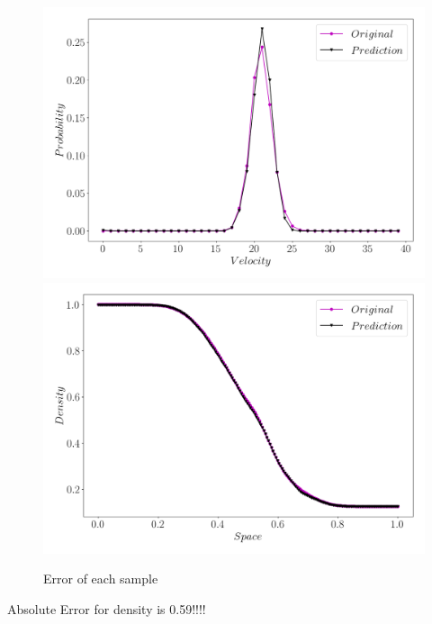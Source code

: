 \documentclass[12pt, a4paper]{article}
\begin{document}
\begin{figure}[htb!]
	\centering
	\includegraphics[width=.49\textwidth]{Sample500_v1_1.png}
	\includegraphics[width=.49\textwidth]{Density_last_v1_1.png}
	\caption{Error of each sample}
	\label{Fig:Errormore}
\end{figure}
Absolute Error for density is 0.59!!!!
\end{document}
